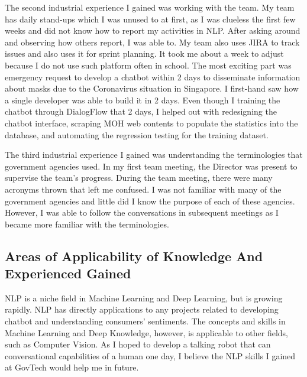 \noindent 
The second industrial experience I gained was working with the team. My team has daily stand-ups which I was unused to at first, as I was clueless the first few weeks and did not know how to report my activities in NLP. After asking around and observing how others report, I was able to. My team also uses JIRA to track issues and also uses it for sprint planning. It took me about a week to adjust because I do not use such platform often in school. The most exciting part was emergency request to develop a chatbot within 2 days to disseminate information about masks due to the Coronavirus situation in Singapore. I first-hand saw how a single developer was able to build it in 2 days. Even though I training the chatbot through DialogFlow that 2 days, I helped out with redesigning the chatbot interface, scraping MOH web contents to populate the statistics into the database, and automating the regression testing for the training dataset.

\noindent
The third industrial experience I gained was understanding the terminologies that government agencies used. In my first team meeting, the Director was present to supervise the team's progress. During the team meeting, there were many acronyms thrown that left me confused. I was not familiar with many of the government agencies and little did I know the purpose of each of these agencies. However, I was able to follow the conversations in subsequent meetings as I became more familiar with the terminologies.


\subsection{Areas of Applicability of Knowledge And Experienced Gained}
\noindent
NLP is a niche field in Machine Learning and Deep Learning, but is growing rapidly. NLP has directly applications to any projects related to developing chatbot and understanding consumers' sentiments. The concepts and skills in Machine Learning and Deep Knowledge, however, is applicable to other fields, such as Computer Vision. As I hoped to develop a talking robot that can conversational capabilities of a human one day, I believe the NLP skills I gained at GovTech would help me in future.
